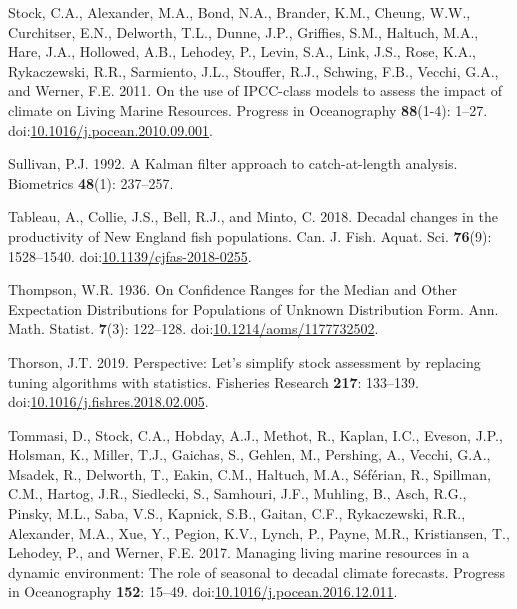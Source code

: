\documentclass[]{article}
\begin{document}
\leavevmode\hypertarget{ref-stock2011Use}{}%
Stock, C.A., Alexander, M.A., Bond, N.A., Brander, K.M., Cheung, W.W.,
Curchitser, E.N., Delworth, T.L., Dunne, J.P., Griffies, S.M., Haltuch,
M.A., Hare, J.A., Hollowed, A.B., Lehodey, P., Levin, S.A., Link, J.S.,
Rose, K.A., Rykaczewski, R.R., Sarmiento, J.L., Stouffer, R.J., Schwing,
F.B., Vecchi, G.A., and Werner, F.E. 2011. On the use of IPCC-class
models to assess the impact of climate on Living Marine Resources.
Progress in Oceanography \textbf{88}(1-4): 1--27.
doi:\href{https://doi.org/10.1016/j.pocean.2010.09.001}{10.1016/j.pocean.2010.09.001}.

\leavevmode\hypertarget{ref-sullivan1992Kalman}{}%
Sullivan, P.J. 1992. A Kalman filter approach to catch-at-length
analysis. Biometrics \textbf{48}(1): 237--257.

\leavevmode\hypertarget{ref-tableau2018Decadal}{}%
Tableau, A., Collie, J.S., Bell, R.J., and Minto, C. 2018. Decadal
changes in the productivity of New England fish populations. Can. J.
Fish. Aquat. Sci. \textbf{76}(9): 1528--1540.
doi:\href{https://doi.org/10.1139/cjfas-2018-0255}{10.1139/cjfas-2018-0255}.

\leavevmode\hypertarget{ref-thompson1936Confidence}{}%
Thompson, W.R. 1936. On Confidence Ranges for the Median and Other
Expectation Distributions for Populations of Unknown Distribution Form.
Ann. Math. Statist. \textbf{7}(3): 122--128.
doi:\href{https://doi.org/10.1214/aoms/1177732502}{10.1214/aoms/1177732502}.

\leavevmode\hypertarget{ref-thorson2019Perspective}{}%
Thorson, J.T. 2019. Perspective: Let's simplify stock assessment by
replacing tuning algorithms with statistics. Fisheries Research
\textbf{217}: 133--139.
doi:\href{https://doi.org/10.1016/j.fishres.2018.02.005}{10.1016/j.fishres.2018.02.005}.

\leavevmode\hypertarget{ref-tommasi2017Managing}{}%
Tommasi, D., Stock, C.A., Hobday, A.J., Methot, R., Kaplan, I.C.,
Eveson, J.P., Holsman, K., Miller, T.J., Gaichas, S., Gehlen, M.,
Pershing, A., Vecchi, G.A., Msadek, R., Delworth, T., Eakin, C.M.,
Haltuch, M.A., Séférian, R., Spillman, C.M., Hartog, J.R., Siedlecki,
S., Samhouri, J.F., Muhling, B., Asch, R.G., Pinsky, M.L., Saba, V.S.,
Kapnick, S.B., Gaitan, C.F., Rykaczewski, R.R., Alexander, M.A., Xue,
Y., Pegion, K.V., Lynch, P., Payne, M.R., Kristiansen, T., Lehodey, P.,
and Werner, F.E. 2017. Managing living marine resources in a dynamic
environment: The role of seasonal to decadal climate forecasts. Progress
in Oceanography \textbf{152}: 15--49.
doi:\href{https://doi.org/10.1016/j.pocean.2016.12.011}{10.1016/j.pocean.2016.12.011}.
\end{document}
